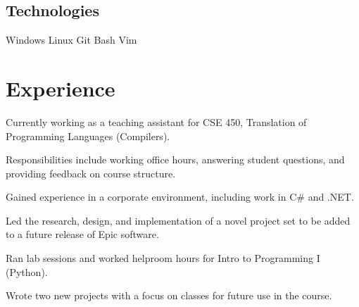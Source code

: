 \documentclass[]{deedy-resume-openfont}
\begin{document}
\begin{minipage}[t]{0.33\textwidth}
\subsection{Technologies}
Windows \textbullet{} Linux \textbullet{} Git \textbullet{} Bash \textbullet{} Vim

%
%

\end{minipage} 
\hfill
\begin{minipage}[t]{0.66\textwidth} 


\section{Experience}

\vspace{\topsep} %
\begin{tightemize}
\item Currently working as a teaching assistant for CSE 450, Translation of Programming Languages (Compilers).
\item Responsibilities include working office hours, answering student questions, and providing feedback on course structure.
\end{tightemize}
\sectionsep

\begin{tightemize}
\item Gained experience in a corporate environment, including work in C\# and .NET.
\item Led the research, design, and implementation of a novel project set to be added to a future release of Epic software.
\end{tightemize}
\sectionsep

\begin{tightemize}
\item Ran lab sessions and worked helproom hours for Intro to Programming I (Python).
\item Wrote two new projects with a focus on classes for future use in the course.
\end{tightemize}
\sectionsep


\end{minipage}
\end{document}
